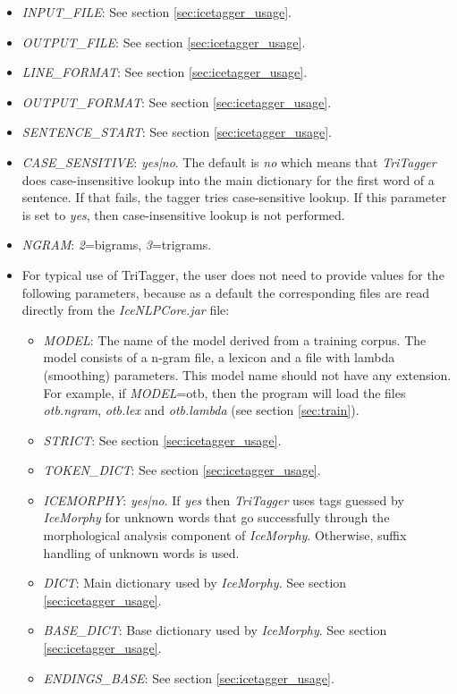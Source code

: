 \documentclass[11pt]{article}
\begin{document}
\begin{itemize}
\begin{itemize}
\item \emph{INPUT\_FILE}: See section \ref{sec:icetagger_usage}.
\item \emph{OUTPUT\_FILE}: See section \ref{sec:icetagger_usage}.
\item \emph{LINE\_FORMAT}: See section \ref{sec:icetagger_usage}.
\item \emph{OUTPUT\_FORMAT}: See section \ref{sec:icetagger_usage}.
\item \emph{SENTENCE\_START}: See section \ref{sec:icetagger_usage}.
\item \emph{CASE\_SENSITIVE}: \emph{yes|no}. The default is \emph{no} which means that \emph{TriTagger} does case-insensitive lookup into the main dictionary for the first word of a sentence. If that fails, the tagger tries case-sensitive lookup. If this parameter is set to \emph{yes}, then case-insensitive lookup is not performed. 
\item \emph{NGRAM}: \emph{2}=bigrams, \emph{3}=trigrams.
\item For typical use of TriTagger, the user does not need to provide values for the following parameters, because as a default the corresponding files are read directly from the \emph{IceNLPCore.jar} file:
\begin{itemize}
\item \emph{MODEL}: The name of the model derived from a training corpus. The model consists of a n-gram file, a lexicon and a file with lambda (smoothing) parameters. This model name should not have any extension. For example, if \emph{MODEL}=otb, then the program will load the files \emph{otb.ngram}, \emph{otb.lex} and \emph{otb.lambda} (see section \ref{sec:train}).
\item \emph{STRICT}: See section \ref{sec:icetagger_usage}.
\item \emph{TOKEN\_DICT}: See section \ref{sec:icetagger_usage}.
\item \emph{ICEMORPHY}: \emph{yes|no}. If \emph{yes} then \emph{TriTagger} uses tags guessed by \emph{IceMorphy} for unknown words that go successfully through the morphological analysis component of \emph{IceMorphy}. Otherwise, suffix handling of unknown words is used.
\item \emph{DICT}: Main dictionary used by \emph{IceMorphy}. See section \ref{sec:icetagger_usage}.
\item \emph{BASE\_DICT}: Base dictionary used by \emph{IceMorphy}. See section \ref{sec:icetagger_usage}.
\item \emph{ENDINGS\_BASE}: See section \ref{sec:icetagger_usage}.

\end{itemize}
\end{itemize}
\end{itemize}
\end{document}
